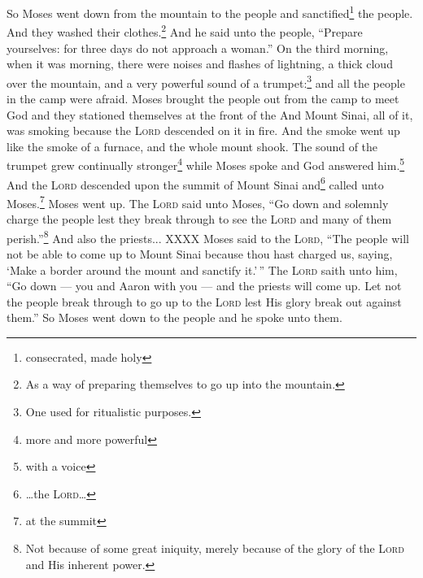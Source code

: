 \begin{enumerate}
     So Moses went down from the mountain to the people and sanctified\footnote{consecrated, made holy} the people. And they washed their clothes.\footnote{As a way of preparing themselves to go up into the mountain.}%
     And he said unto the people, ``Prepare yourselves: for three days do not approach a woman.''%
     On the third morning, when it was morning, there were noises and flashes of lightning, a thick cloud over the mountain, and a very powerful sound of a trumpet:\footnote{One used for ritualistic purposes.} and all the people in the camp were afraid.%
     Moses brought the people out from the camp to meet God and they stationed themselves at the front of the %
     And Mount Sinai, all of it, was smoking because the \textsc{Lord} descended on it in fire. And the smoke went up like the smoke of a furnace, and the whole mount shook.%
     The sound of the trumpet grew continually stronger\footnote{more and more powerful} while Moses spoke and God answered him.\footnote{with a voice}%
     And the \textsc{Lord} descended upon the summit of Mount Sinai and\footnote{\dots the \textsc{Lord}\dots} called unto Moses.\footnote{at the summit} Moses went up.%
     The \textsc{Lord} said unto Moses, ``Go down and solemnly charge the people lest they break through to see the \textsc{Lord} and many of them perish.''\footnote{Not because of some great iniquity, merely because of the glory of the \textsc{Lord} and His inherent power.}%
     And also the priests... XXXX%
     Moses said to the \textsc{Lord}, ``The people will not be able to come up to Mount Sinai because thou hast charged us, saying, `Make a border around the mount and sanctify it.'$\,$''%
     The \textsc{Lord} saith unto him, ``Go down — you and Aaron with you — and the priests will come up. Let not the people break through to go up to the \textsc{Lord} lest His glory break out against them.''%
     So Moses went down to the people and he spoke unto them.%
\end{enumerate}
